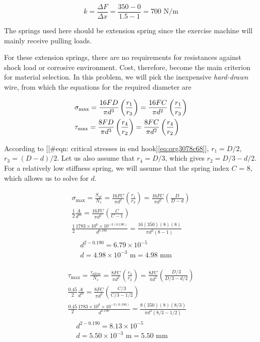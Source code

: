 \documentclass[a4paper,openany,12pt]{book}
\begin{document}
{{\begin{enumerate}
$$k = \frac{\Delta F}{\Delta x} = \frac{350 - 0}{1.5 - 1} = 700\text{ N/m}$$

The springs used here should be extension spring since the exercise
machine will mainly receive pulling loads.

For these extension springs, there are no requirements for resistances
against shock load or corrosive environment. Cost, therefore, become the
main criterion for material selection. In this problem, we will pick the
inexpensive \emph{hard-drawn} wire, from which the equations for the required
diameter are

$$\begin{gathered}
  \sigma_{\max} = \frac{16FD}{\pi d^3}\left( \frac{r_1}{r_3} \right) = \frac{16FC}{\pi d^2}\left( \frac{r_1}{r_3} \right) \hfill \\
  \tau_{\max} = \frac{8FD}{\pi d^3}\left( \frac{r_4}{r_2} \right) = \frac{8FC}{\pi d^2}\left( \frac{r_4}{r_2} \right) \hfill \\ 
\end{gathered}$$

According to
[[\#eqn: critical stresses in end hook]\ref{eq:org3078c68}],
\(r_1 = D / 2\), \(r_3 = (D - d) / 2\). Let us also assume that
\(r_4 = D / 3\), which gives \(r_2 = D / 3 - d / 2\). For a relatively low
stiffness spring, we will assume that the spring index \(C\) = 8, which
allows us to solve for \(d\).

$$\begin{gathered}
  \sigma_{\max} = \frac{S_{ut}}{N_s} = \frac{16FC}{\pi d^2}\left( \frac{r_1}{r_3} \right) = \frac{16FC}{\pi d^2}\left( \frac{D}{D - d} \right) \\
  \frac{1}{2}\frac{A}{d^m} = \frac{16FC}{\pi d^2}\left( \frac{C}{C - 1} \right) \\ 
  \frac{1}{2}\frac{1783 \times 10^6 \times 10^{-3(0.190)}}{d^{0.190}} = \frac{16(350)(8)(8)}{\pi d^2(8 - 1)} \\
  \begin{aligned}
  &d^{2-0.190} = 6.79 \times 10^{-5} \\ 
  &d = 4.98 \times 10^{-3} \text{ m} = 4.98\text{ mm}
  \end{aligned}\end{gathered}$$

$$\begin{gathered}
  \tau_{\max} = \frac{\tau_{allow}}{N_s} = \frac{8FC}{\pi d^2}\left( \frac{r_4}{r_2} \right) = \frac{8FC}{\pi d^2}\left( \frac{D/3}{D/3 - d/2} \right) \\ 
  \frac{0.45}{2}\frac{A}{d^m} = \frac{8FC}{\pi d^2}\left( \frac{C/3}{C/3 - 1/2} \right) \\ 
  \frac{0.45}{2}\frac{1783 \times 10^6 \times 10^{-3(0.190)}}{d^{0.190}} = \frac{8(350)(8)(8/3)}{\pi d^2(8/3 - 1/2)} \\
  \begin{aligned}
  &d^{2-0.190} = 8.13 \times 10^{-5} \\ 
  &d = 5.50 \times 10^{-3}\text{ m} = 5.50 \text{ mm}
  \end{aligned}\end{gathered}$$


\end{enumerate}}}
\end{document}
